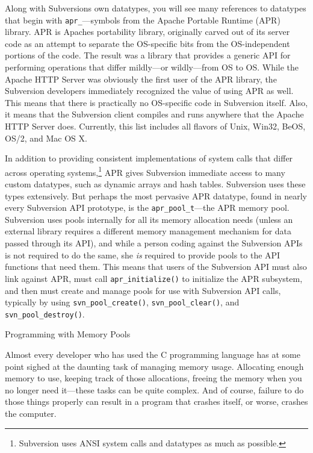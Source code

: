 Along with Subversion\textquotesingle s own datatypes, you will see many
references to datatypes that begin with \texttt{apr\_}---symbols from
the Apache Portable Runtime (APR) library. APR is
Apache\textquotesingle s portability library, originally carved out of
its server code as an attempt to separate the OS-specific bits from the
OS-independent portions of the code. The result was a library that
provides a generic API for performing operations that differ mildly---or
wildly---from OS to OS. While the Apache HTTP Server was obviously the
first user of the APR library, the Subversion developers immediately
recognized the value of using APR as well. This means that there is
practically no OS-specific code in Subversion itself. Also, it means
that the Subversion client compiles and runs anywhere that the Apache
HTTP Server does. Currently, this list includes all flavors of Unix,
Win32, BeOS, OS/2, and Mac OS X.

In addition to providing consistent implementations of system calls that
differ across operating systems,\footnote{Subversion uses ANSI system
  calls and datatypes as much as possible.} APR gives Subversion
immediate access to many custom datatypes, such as dynamic arrays and
hash tables. Subversion uses these types extensively. But perhaps the
most pervasive APR datatype, found in nearly every Subversion API
prototype, is the \texttt{apr\_pool\_t}---the APR memory pool.
Subversion uses pools internally for all its memory allocation needs
(unless an external library requires a different memory management
mechanism for data passed through its API), and while a person coding
against the
Subversion APIs is not required to do the same, she \emph{is} required
to provide pools to the API functions that need them. This means that
users of the Subversion API must also link against APR, must call
\texttt{apr\_initialize()} to initialize the APR subsystem, and then
must create and manage pools for use with Subversion API calls,
typically by using \texttt{svn\_pool\_create()},
\texttt{svn\_pool\_clear()}, and \texttt{svn\_pool\_destroy()}.

Programming with Memory Pools

Almost every developer who has used the C programming language has at
some point sighed at the daunting task of managing memory usage.
Allocating enough memory to use, keeping track of those allocations,
freeing the memory when you no longer need it---these tasks can be quite
complex. And of course, failure to do those things properly can result
in a program that crashes itself, or worse, crashes the computer.


